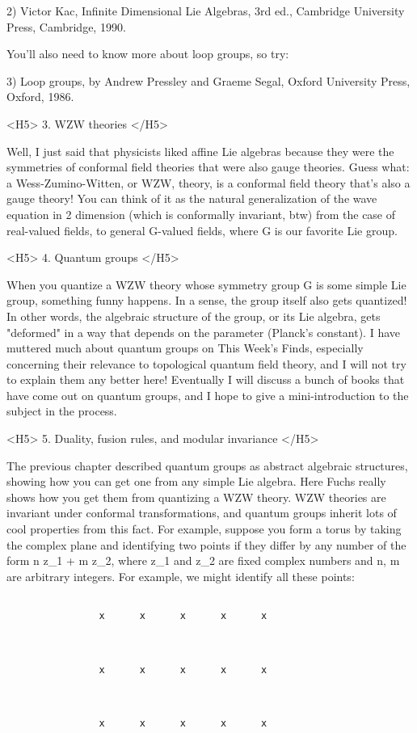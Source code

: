 2) Victor Kac, Infinite Dimensional Lie Algebras, 3rd ed.,
Cambridge University Press, Cambridge, 1990.

You'll also need to know more about loop groups, so try:

3) Loop groups, by Andrew Pressley and Graeme Segal, Oxford University
Press, Oxford, 1986. 

<H5> 3.  WZW theories </H5>

Well, I just said that physicists liked affine Lie algebras because they
were the symmetries of conformal field theories that were also gauge
theories.  Guess what: a Wess-Zumino-Witten, or WZW, theory, is a
conformal field theory that's also a gauge theory!  You can think of it
as the natural generalization of the wave equation in 2 dimension (which
is conformally invariant, btw) from the case of real-valued fields, to
general G-valued fields, where G is our favorite Lie group.  

<H5> 4.  Quantum groups </H5>

When you quantize a WZW theory whose symmetry group G is some simple
Lie group, something funny happens.  In a sense, the group itself
also gets quantized!  In other words, the algebraic structure of
the group, or its Lie algebra, gets "deformed" in a way that depends on 
the parameter \hbar  (Planck's constant).  I have muttered much about
quantum groups on This Week's Finds, especially concerning their
relevance to topological quantum field theory, and I will not try to
explain them any better here!  Eventually I will discuss a bunch of
books that have come out on quantum groups, and I hope to give
a mini-introduction to the subject in the process.

<H5> 5.  Duality, fusion rules, and modular invariance </H5>

The previous chapter described quantum groups as abstract algebraic
structures, showing how you can get one from any simple Lie algebra.
Here Fuchs really shows how you get them from quantizing a WZW theory.
WZW theories are invariant under conformal transformations, and
quantum groups inherit lots of cool properties from this fact.  For
example, suppose you form a torus by taking the complex plane
and identifying two points if they differ by any number of the form
n z_{1} + m z_{2}, where z_{1} and z_{2} 
are fixed complex numbers and n, m are arbitrary integers.  For example, 
we might identify all these points:



\begin{verbatim}

                x      x      x      x      x



                x      x      x      x      x



                x      x      x      x      x

\end{verbatim}
    

